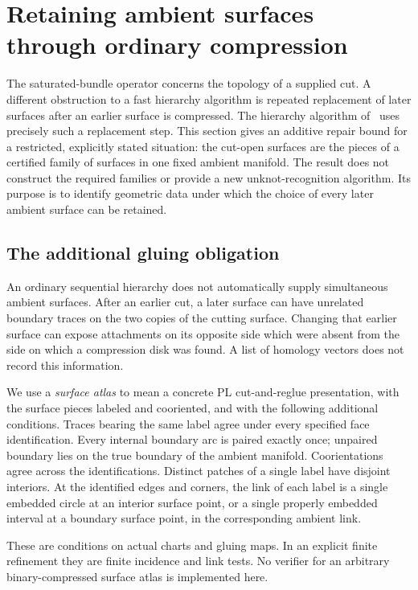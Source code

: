 \section{Retaining ambient surfaces through ordinary compression}
\label{sec:seam-repair}

The saturated-bundle operator concerns the topology of a supplied cut.  A
different obstruction to a fast hierarchy algorithm is repeated replacement
of later surfaces after an earlier surface is compressed.  The hierarchy
algorithm of~\cite[Sections~6 and~9]{lackenby2026} uses precisely such a
replacement step.  This section gives an additive repair bound for a
restricted, explicitly stated situation: the cut-open surfaces are the
pieces of a certified family of surfaces in one fixed ambient manifold.
The result does not construct the required families or provide a new
unknot-recognition algorithm.  Its purpose is to identify geometric data
under which the choice of every later ambient surface can be retained.

\subsection{The additional gluing obligation}

An ordinary sequential hierarchy does not automatically supply simultaneous
ambient surfaces.  After an earlier cut, a later surface can have unrelated
boundary traces on the two copies of the cutting surface.  Changing that
earlier surface can expose attachments on its opposite side which were
absent from the side on which a compression disk was found.  A list of
homology vectors does not record this information.

We use a \emph{surface atlas} to mean a concrete PL cut-and-reglue
presentation, with the surface pieces labeled and cooriented, and with the
following additional conditions.  Traces bearing the same label agree
under every specified face identification.  Every internal boundary arc is
paired exactly once; unpaired boundary lies on the true boundary of the
ambient manifold.  Coorientations agree across the identifications.
Distinct patches of a single label have disjoint interiors.  At the
identified edges and corners, the link of each label is a single embedded
circle at an interior surface point, or a single properly embedded interval
at a boundary surface point, in the corresponding ambient link.

These are conditions on actual charts and gluing maps.  In an explicit
finite refinement they are finite incidence and link tests.  No verifier
for an arbitrary binary-compressed surface atlas is implemented here.


